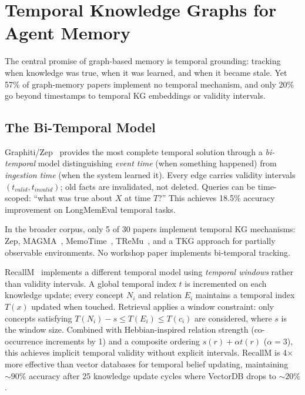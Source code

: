 \documentclass[hf]{ceurart}
\begin{document}
\section{Temporal Knowledge Graphs for Agent Memory}
\label{sec:temporal}

The central promise of graph-based memory is temporal grounding: tracking
when knowledge was true, when it was learned, and when it became stale.
Yet 57\% of graph-memory papers implement no temporal mechanism, and only
20\% go beyond timestamps to temporal KG embeddings or validity intervals.

\subsection{The Bi-Temporal Model}

Graphiti/Zep~\cite{rasmussen2025} provides the most complete temporal
solution through a \emph{bi-temporal} model distinguishing
\emph{event time} (when something happened) from \emph{ingestion time}
(when the system learned it). Every edge carries validity intervals
$(t_{valid}, t_{invalid})$; old facts are invalidated, not deleted.
Queries can be time-scoped: ``what was true about $X$ at time $T$?''
This achieves 18.5\% accuracy improvement on LongMemEval temporal tasks.

In the broader corpus, only 5 of 30 papers implement temporal KG
mechanisms: Zep, MAGMA~\cite{magma2026}, MemoTime~\cite{memotime2025},
TReMu~\cite{tremu2025}, and a TKG approach for partially observable
environments. No workshop paper implements bi-temporal tracking.

RecallM~\cite{recallm2023} implements a different temporal model using
\emph{temporal windows} rather than validity intervals. A global
temporal index $t$ is incremented on each knowledge update; every
concept $N_i$ and relation $E_i$ maintains a temporal index $T(x)$
updated when touched. Retrieval applies a window constraint:
only concepts satisfying $T(N_i) - s \leq T(E_i) \leq T(c_i)$ are
considered, where $s$ is the window size. Combined with
Hebbian-inspired relation strength (co-occurrence increments by 1)
and a composite ordering $s(r) + \alpha t(r)$ ($\alpha{=}3$), this
achieves implicit temporal validity without explicit intervals.
RecallM is 4$\times$ more effective than vector databases for temporal
belief updating, maintaining ${\sim}90\%$ accuracy after 25 knowledge
update cycles where VectorDB drops to ${\sim}20\%$.
\end{document}
